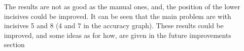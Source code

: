 The results are not as good as the manual ones, and, the position of the lower
incisives could be improved. It can be seen that the main problem are with
incisives 5 and 8 (4 and 7 in the accuracy graph). These results could be
improved, and some ideas as for how, are given in the future improvements section


